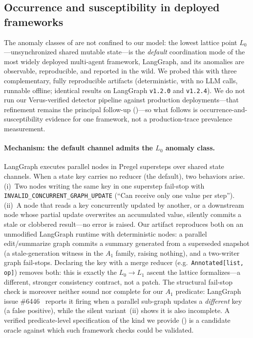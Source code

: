 \documentclass[journal,compsoc,10pt]{IEEEtran}
\providecommand{\citep}{\cite}
\theoremstyle{definition}
\theoremstyle{remark}
\begin{document}
\subsection{Occurrence and susceptibility in deployed frameworks}
\label{sec:real-world-manifestations}
The anomaly classes of  are not confined to our
model: the lowest lattice point $L_0$---unsynchronized shared mutable
state---is the \emph{default} coordination mode of the most widely
deployed multi-agent framework, LangGraph, and its anomalies are
observable, reproducible, and reported in the wild. We probed this with
three complementary, fully reproducible artifacts (deterministic, with no
LLM calls, runnable offline; identical results on LangGraph
\texttt{v1.2.0} and \texttt{v1.2.4}). We do not run our Verus-verified
detector pipeline against production deployments---that refinement remains
the principal follow-up ()---so what follows is
occurrence-and-susceptibility evidence for one framework, not a
production-trace prevalence measurement.

\paragraph{Mechanism: the default channel admits the $L_0$ anomaly class.}
LangGraph executes parallel nodes in Pregel supersteps over shared state
channels. When a state key carries no reducer (the default), two
behaviors arise. (i)~Two nodes writing the same key in one superstep
fail-stop with \texttt{INVALID\_CONCURRENT\_GRAPH\_UPDATE}
\citep{LangGraphInvalidConcurrent} (``Can receive only one value per
step''). (ii)~A node that reads a key concurrently updated by another, or
a downstream node whose partial update overwrites an accumulated value,
silently commits a stale or clobbered result---no error is raised. Our
artifact reproduces both on an unmodified LangGraph runtime with
deterministic nodes: a parallel edit/summarize graph commits a summary
generated from a superseded snapshot (a stale-generation witness in the
$A_1$ family, raising nothing), and a two-writer graph fail-stops.
Declaring the key with a merge reducer (e.g.\ \texttt{Annotated[list,
op]}) removes both: this is exactly the $L_0 \to L_1$ ascent the lattice
formalizes---a different, stronger consistency contract, not a patch. The
structural fail-stop check is moreover neither sound nor complete for our
$A_1$ predicate: LangGraph issue \#6446~\citep{LangGraphIssue6446} reports
it firing when a parallel sub-graph updates a \emph{different} key (a
false positive), while the silent variant~(ii) shows it is also
incomplete. A verified predicate-level specification of the kind we
provide () is a candidate oracle against which
such framework checks could be validated.
\end{document}

